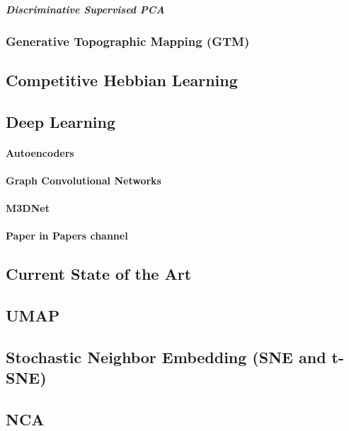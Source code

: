 \subparagraph{Discriminative Supervised PCA} 


\subsubsection{Generative Topographic Mapping (GTM)}

\subsection{Competitive Hebbian Learning}

\subsection{Deep Learning}

\paragraph{Autoencoders}


\paragraph{Graph Convolutional Networks}

\paragraph{M3DNet}

\paragraph{Paper in Papers channel}

\subsection{Current State of the Art}
\subsection{UMAP}

\subsection{Stochastic Neighbor Embedding (SNE and t-SNE)}

\subsection{NCA}

